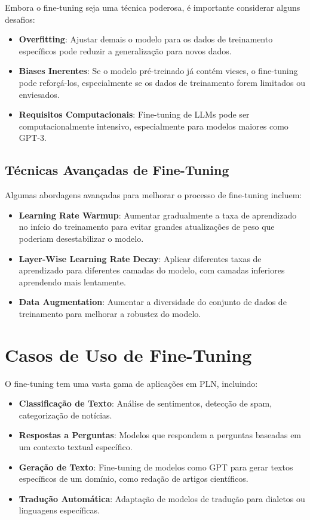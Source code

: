 \documentclass[14pt,a4paper,oneside]{book}
\begin{document}
Embora o fine-tuning seja uma técnica poderosa, é importante considerar alguns desafios:

\begin{itemize}
	\item \textbf{Overfitting}: Ajustar demais o modelo para os dados de treinamento específicos pode reduzir a generalização para novos dados.
	\item \textbf{Biases Inerentes}: Se o modelo pré-treinado já contém vieses, o fine-tuning pode reforçá-los, especialmente se os dados de treinamento forem limitados ou enviesados.
	\item \textbf{Requisitos Computacionais}: Fine-tuning de LLMs pode ser computacionalmente intensivo, especialmente para modelos maiores como GPT-3.
\end{itemize}

\subsection{Técnicas Avançadas de Fine-Tuning}

Algumas abordagens avançadas para melhorar o processo de fine-tuning incluem:

\begin{itemize}
	\item \textbf{Learning Rate Warmup}: Aumentar gradualmente a taxa de aprendizado no início do treinamento para evitar grandes atualizações de peso que poderiam desestabilizar o modelo.
	\item \textbf{Layer-Wise Learning Rate Decay}: Aplicar diferentes taxas de aprendizado para diferentes camadas do modelo, com camadas inferiores aprendendo mais lentamente.
	\item \textbf{Data Augmentation}: Aumentar a diversidade do conjunto de dados de treinamento para melhorar a robustez do modelo.
\end{itemize}

\section{Casos de Uso de Fine-Tuning}

O fine-tuning tem uma vasta gama de aplicações em PLN, incluindo:

\begin{itemize}
	\item \textbf{Classificação de Texto}: Análise de sentimentos, detecção de spam, categorização de notícias.
	\item \textbf{Respostas a Perguntas}: Modelos que respondem a perguntas baseadas em um contexto textual específico.
	\item \textbf{Geração de Texto}: Fine-tuning de modelos como GPT para gerar textos específicos de um domínio, como redação de artigos científicos.
	\item \textbf{Tradução Automática}: Adaptação de modelos de tradução para dialetos ou linguagens específicas.
\end{itemize}
\end{document}

